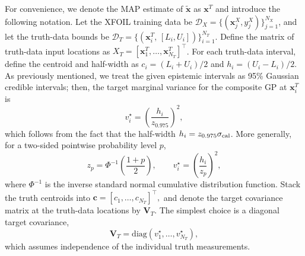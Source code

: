 \documentclass[journal]{new-aiaa}
\newcommand{\T}{\textnormal}
\newcommand{\x}{\mathbf{x}}
\begin{document}
For convenience, we denote the MAP estimate of $\tilde{\x}$ as $\x^T$ and introduce the following notation. Let the XFOIL training data be
$\mathcal{D}_X=\{(\x^{X}_j,y^{X}_j)\}_{j=1}^{N_X}$, and let the truth-data
bounds be $\mathcal{D}_T=\{(\x^{T}_i,\,[L_i,U_i])\}_{i=1}^{N_T}$.  Define the
matrix of truth-data input locations as $X_T=[\x^{T}_1,\ldots,\x^{T}_{N_T}]^\top$.
For each truth-data interval, define the centroid and half-width as
$c_i=(L_i+U_i)/2$ and $h_i=(U_i-L_i)/2$.
As previously mentioned, we treat the given epistemic intervals as 95\% Gaussian
credible intervals; then, the target marginal variance for the composite GP at
$\x_i^T$ is
\begin{equation*}
    v_i^\star
    =
    \left(
    \frac{h_i}{z_{0.975}}
    \right)^2,
    \label{eq:target_variance_95}
\end{equation*}
which follows from the fact that the half-width $h_i = z_{0.975} \sigma_{\T{cal}}$. More generally, for a two-sided pointwise probability level $p$,
\begin{equation*}
    z_p
    =
    \Phi^{-1}
    \left(
    \frac{1+p}{2}
    \right),
    \qquad
    v_i^\star
    =
    \left(
    \frac{h_i}{z_p}
    \right)^2 ,
\end{equation*}
where $\Phi^{-1}$ is the inverse standard normal cumulative distribution
function. Stack the truth centroids into $\mathbf{c}
    =
    \left[
    c_1,\ldots,c_{N_T}
    \right]^\top,$ and denote the target covariance matrix at the truth-data locations by
$\mathbf{V}_T$.  The simplest choice is a diagonal target covariance,
\begin{equation}
    \mathbf{V}_T
    =
    \mathrm{diag}
    \left(
    v_1^\star,\ldots,v_{N_T}^\star
    \right),
    \label{eq:diagonal_target_covariance}
\end{equation}
which assumes independence of the individual truth measurements. 
\end{document}
